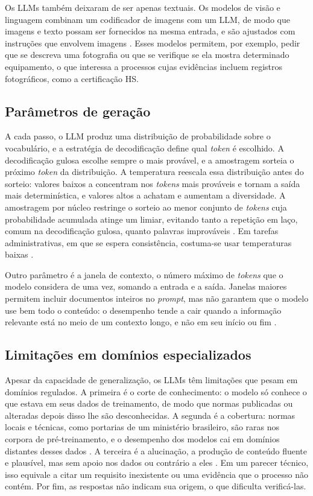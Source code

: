 Os LLMs também deixaram de ser apenas textuais. Os modelos de visão e linguagem combinam um codificador de imagens com um LLM, de modo que imagens e texto possam ser fornecidos na mesma entrada, e são ajustados com instruções que envolvem imagens \cite{Liu2023}. Esses modelos permitem, por exemplo, pedir que se descreva uma fotografia ou que se verifique se ela mostra determinado equipamento, o que interessa a processos cujas evidências incluem registros fotográficos, como a certificação HS.

\subsection{Parâmetros de geração}

A cada passo, o LLM produz uma distribuição de probabilidade sobre o vocabulário, e a estratégia de decodificação define qual \textit{token} é escolhido. A decodificação gulosa escolhe sempre o mais provável, e a amostragem sorteia o próximo \textit{token} da distribuição. A temperatura reescala essa distribuição antes do sorteio: valores baixos a concentram nos \textit{tokens} mais prováveis e tornam a saída mais determinística, e valores altos a achatam e aumentam a diversidade. A amostragem por núcleo restringe o sorteio ao menor conjunto de \textit{tokens} cuja probabilidade acumulada atinge um limiar, evitando tanto a repetição em laço, comum na decodificação gulosa, quanto palavras improváveis \cite{Holtzman2020}. Em tarefas administrativas, em que se espera consistência, costuma-se usar temperaturas baixas \cite{Montero2026}.

Outro parâmetro é a janela de contexto, o número máximo de \textit{tokens} que o modelo considera de uma vez, somando a entrada e a saída. Janelas maiores permitem incluir documentos inteiros no \textit{prompt}, mas não garantem que o modelo use bem todo o conteúdo: o desempenho tende a cair quando a informação relevante está no meio de um contexto longo, e não em seu início ou fim \cite{Liu2024}.

\subsection{Limitações em domínios especializados}

Apesar da capacidade de generalização, os LLMs têm limitações que pesam em domínios regulados. A primeira é o corte de conhecimento: o modelo só conhece o que estava em seus dados de treinamento, de modo que normas publicadas ou alteradas depois disso lhe são desconhecidas. A segunda é a cobertura: normas locais e técnicas, como portarias de um ministério brasileiro, são raras nos corpora de pré-treinamento, e o desempenho dos modelos cai em domínios distantes desses dados \cite{Gururangan2020}. A terceira é a alucinação, a produção de conteúdo fluente e plausível, mas sem apoio nos dados ou contrário a eles \cite{Ji2023}. Em um parecer técnico, isso equivale a citar um requisito inexistente ou uma evidência que o processo não contém. Por fim, as respostas não indicam sua origem, o que dificulta verificá-las.

